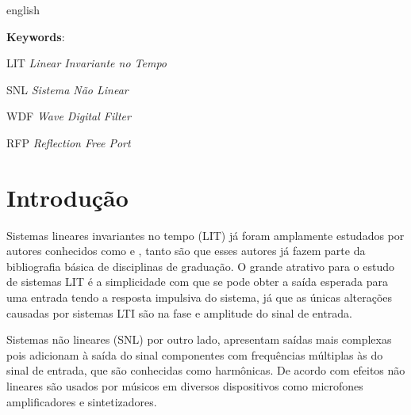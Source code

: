 \begin{resumo}[Abstract]
 \begin{otherlanguage*}{english}
	
   \vspace{\onelineskip}
   \noindent 
   \textbf{Keywords}:
 \end{otherlanguage*}
\end{resumo}


\listoffigures*
\cleardoublepage

\listoftables*
\cleardoublepage

\begin{siglas}
	\item[LIT]		\emph{Linear Invariante no Tempo}
	\item[SNL]		\emph{Sistema Não Linear}
	\item[WDF]		\emph{Wave Digital Filter}
	\item[RFP]		\emph{Reflection Free Port}

\end{siglas}

\tableofcontents*
\cleardoublepage

\textual
	\chapter{Introdução}

Sistemas lineares invariantes no tempo (LIT) já foram amplamente estudados por autores conhecidos como  e  , tanto são que esses autores já fazem parte da bibliografia básica de disciplinas de graduação. O grande atrativo para o estudo de sistemas LIT é a simplicidade com que se pode obter a saída esperada para uma entrada tendo a resposta impulsiva do sistema, já que as únicas alterações causadas por sistemas LTI são na fase e amplitude do sinal de entrada.

Sistemas não lineares (SNL) por outro lado, apresentam saídas mais complexas pois adicionam à saída do sinal componentes com frequências múltiplas às do sinal de entrada, que são conhecidas como harmônicas. De acordo com  efeitos não lineares são usados por músicos em diversos dispositivos como microfones amplificadores e sintetizadores.

